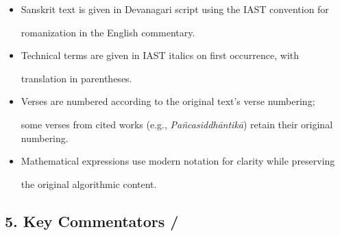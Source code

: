 \documentclass[10pt,a4paper]{article}
\begin{document}
\begin{itemize}

\item Sanskrit text is given in Devanagari script using the IAST convention for

romanization in the English commentary.

\item Technical terms are given in IAST italics on first occurrence, with

translation in parentheses.

\item Verses are numbered according to the original text's verse numbering;

some verses from cited works (e.g., \textit{Pañcasiddhāntikā}) retain their original numbering.

\item Mathematical expressions use modern notation for clarity while preserving

the original algorithmic content.

\end{itemize}



\vspace{1.5em}



\subsection*{5. Key Commentators / }



\begin{minipage}[t]{0.47\textwidth}


\end{minipage}%
\end{document}
